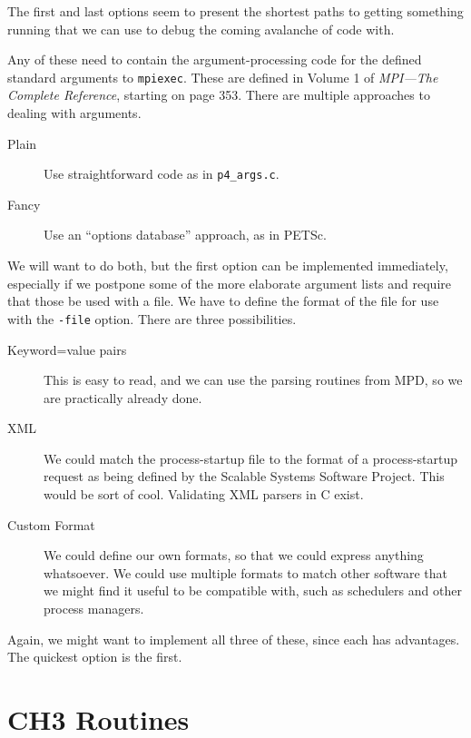 \documentclass{article}
\def\code#1{\texttt{#1}}
\let\file=\code
\begin{document}
The first and last options seem to present the shortest paths to getting
something running that we can use to debug the coming avalanche of code with.

Any of these need to contain the argument-processing code for the defined
standard arguments to \code{mpiexec}.  These are defined in Volume 1 of \emph{ MPI---The Complete Reference}, starting on page 353.  There are multiple
approaches to dealing with arguments.
\begin{description}
\item[Plain] Use straightforward code as in \file{p4_args.c}.
\item[Fancy] Use an ``options database'' approach, as in PETSc.
\end{description}

We will want to do both, but the first option can be implemented
immediately, especially if we postpone some of the more elaborate argument
lists and require that those be used with a file.  We have to define the
format of the file for use with the \code{-file} option.  There are three
possibilities.
\begin{description}
\item[Keyword=value pairs] This is easy to read, and we can use the
  parsing routines from MPD, so we are practically already done.
\item[XML] We could match the process-startup file to the format of a
  process-startup request as being defined by the Scalable Systems Software
  Project.  This would be sort of cool.  Validating XML parsers in C exist.
\item[Custom Format] We could define our own formats, so that we could express
  anything whatsoever.  We could use multiple formats to match other software
  that we might find it useful to be compatible with, such as schedulers and
  other process managers.
\end{description}

Again, we might want to implement all three of these, since each has
advantages.  The quickest option is the first.



\appendix
\section{CH3 Routines}
\label{app:ch3}
\end{document}
